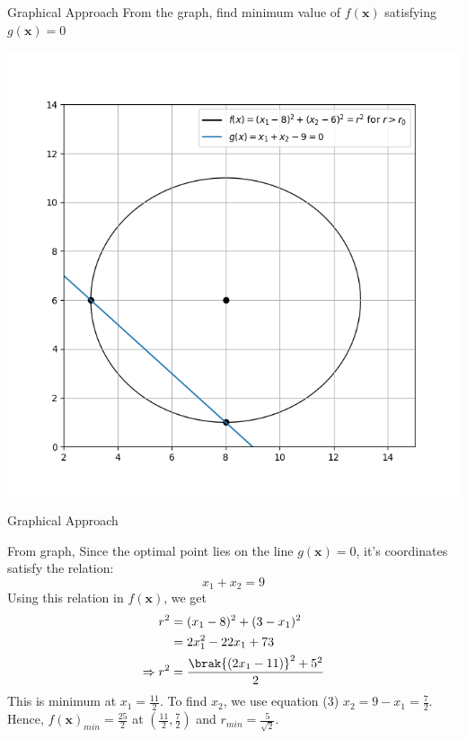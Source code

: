 \documentclass[10pt]{beamer}
\begin{document}
{
\begin{frame}{Graphical Approach}
From the graph, find minimum value of $f(\textbf{x})$ satisfying $g(\textbf{x}) = 0$
	\graphicspath{ {./images/} }
    \includegraphics[scale=0.45,center]{2D_3}
\end{frame}
}
{
\begin{frame}{Graphical Approach}


From graph, \newline
%
Since the optimal point lies on the line $g(\textbf{x}) = 0$, it's coordinates satisfy the relation:
\begin{equation}
    x_1+x_2=9
\end{equation}
Using this relation in $f(\textbf{x})$, we get
\begin{align}
r^2 & = (x_1-8)^2 + (3- x_1)^2 \\
&= 2 x_1^2 - 22 x_1 + 73 \\
\Rightarrow r^2 &= \frac{\brak{(2x_1-11)}^2 + 5^2}{2}
\end{align}
%
This is minimum at $x_1 = \frac{11}{2}$.\newline 
To find $x_2$, we use equation (3)  \Rightarrow $x_2 = 9-x_1 =\frac{7}{2}$.  
\newline \newline Hence,    $f(\boldsymbol{x})_{min} = \frac{25}{2}$ at $(\frac{11}{2},\frac{7}{2})$ and $r_{min} = \frac{5}{\sqrt{2}}$. 
\end{frame}
}
\end{document}
